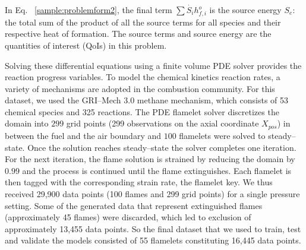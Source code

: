 \documentclass[conf]{new-aiaa}
\begin{document}
In Eq. ~\ref{sample:problemform2}, the final term $\sum{\dot{S_i} h_{f,i}^o }$ is the source energy $S_e$: the total sum of the product of all the source terms for all species and their respective heat of formation. The source terms and source energy are the quantities of interest (QoIs) in this problem. 

Solving these differential equations using a finite volume PDE solver provides the reaction progress variables. To model the chemical kinetics reaction rates, a variety of mechanisms are adopted in the combustion community. For this dataset, we used the GRI--Mech 3.0 methane mechanism, which consists of 53 chemical species and 325 reactions. The PDE flamelet solver discretizes the domain into $299$ grid points (299 observations on the axial coordinate $X_{pos}$) in between the fuel and the air boundary and $100$ flamelets were solved to steady--state. Once the solution reaches steady--state the solver completes one iteration. For the next iteration, the flame solution is strained by reducing the domain by $0.99$ and the process is continued until the flame extinguishes. Each flamelet is then tagged with the corresponding strain rate, the flamelet key. We thus received 29,900 data points (100 flames and 299 grid points) for a single pressure setting. Some of the generated data that represent extinguished flames (approximately 45 flames) were discarded, which led to exclusion of approximately 13,455 data points. So the final dataset that we used to train, test and validate the models consisted of 55 flamelets constituting 16,445 data points.
\end{document}
